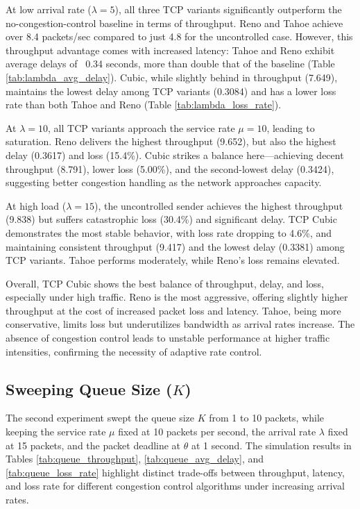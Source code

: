 \documentclass[conference]{IEEEtran}
\begin{document}
At low arrival rate ($\lambda=5$), all three TCP variants significantly outperform the no-congestion-control baseline in terms of throughput. 
Reno and Tahoe achieve over 8.4 packets/sec compared to just 4.8 for the uncontrolled case. 
However, this throughput advantage comes with increased latency: Tahoe and Reno exhibit average delays of ~0.34 seconds, more than double that of the baseline (Table \ref{tab:lambda_avg_delay}). 
Cubic, while slightly behind in throughput (7.649), maintains the lowest delay among TCP variants (0.3084) and has a lower loss rate than both Tahoe and Reno (Table \ref{tab:lambda_loss_rate}).

At $\lambda=10$, all TCP variants approach the service rate $\mu=10$, leading to saturation. 
Reno delivers the highest throughput (9.652), but also the highest delay (0.3617) and loss (15.4\%). 
Cubic strikes a balance here—achieving decent throughput (8.791), lower loss (5.00\%), and the second-lowest delay (0.3424), suggesting better congestion handling as the network approaches capacity.

At high load ($\lambda=15$), the uncontrolled sender achieves the highest throughput (9.838) but suffers catastrophic loss (30.4\%) and significant delay. 
TCP Cubic demonstrates the most stable behavior, with loss rate dropping to 4.6\%, and maintaining consistent throughput (9.417) and the lowest delay (0.3381) among TCP variants. 
Tahoe performs moderately, while Reno's loss remains elevated.

Overall, TCP Cubic shows the best balance of throughput, delay, and loss, especially under high traffic. 
Reno is the most aggressive, offering slightly higher throughput at the cost of increased packet loss and latency. 
Tahoe, being more conservative, limits loss but underutilizes bandwidth as arrival rates increase. 
The absence of congestion control leads to unstable performance at higher traffic intensities, confirming the necessity of adaptive rate control.

\subsection{Sweeping Queue Size ($K$)}
The second experiment swept the queue size $K$ from 1 to 10 packets, while keeping the service rate $\mu$ fixed at 10 packets per second,
the arrival rate $\lambda$ fixed at 15 packets, and the packet deadline at $\theta$ at 1 second.
The simulation results in Tables \ref{tab:queue_throughput}, \ref{tab:queue_avg_delay}, and \ref{tab:queue_loss_rate} highlight distinct trade-offs between throughput, latency, and loss rate for different congestion control algorithms under increasing arrival rates.
\end{document}
